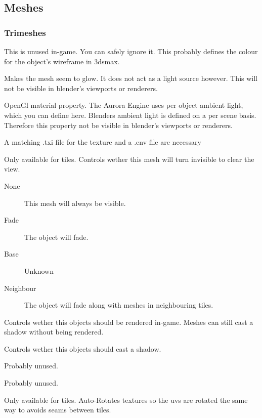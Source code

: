 \subsection{Meshes}

\subsubsection{Trimeshes}

This is unused in-game. You can safely ignore it. This probably defines the
colour for the object's wireframe in 3dsmax.

Makes the mesh seem to glow. It does not act as a light source however.
This will not be visible in blender's viewports or renderers.

OpenGl material property. The Aurora Engine uses per object ambient light,
which you can define here. Blenders ambient light is defined on a per scene
basis. Therefore this property not be visible in blender's viewports or
renderers.

A matching .txi file for the texture and a .env file are necessary

Only available for tiles. Controls wether this mesh will turn invisible to
clear the view.
\begin{description}
    \item[None] This mesh will always be visible.
    \item[Fade] The object will fade.
    \item[Base] Unknown
    \item[Neighbour] The object will fade along with meshes in neighbouring tiles.
\end{description}

Controls wether this objects should be rendered in-game. Meshes can still
cast a shadow without being rendered.

Controls wether this objects should cast a shadow.

Probably unused.

Probably unused.

Only available for tiles. Auto-Rotates textures so the uvs are rotated
the same way to avoids seams between tiles.

